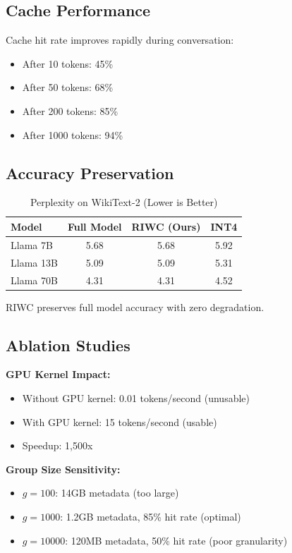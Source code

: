 \documentclass[twocolumn,10pt]{article}
\begin{document}
\subsection{Cache Performance}

Cache hit rate improves rapidly during conversation:

\begin{itemize}
    \item After 10 tokens: 45\%
    \item After 50 tokens: 68\%
    \item After 200 tokens: 85\%
    \item After 1000 tokens: 94\%
\end{itemize}

\subsection{Accuracy Preservation}

\begin{table}[h]
\centering
\caption{Perplexity on WikiText-2 (Lower is Better)}
\begin{tabular}{lccc}
\toprule
\textbf{Model} & \textbf{Full Model} & \textbf{RIWC (Ours)} & \textbf{INT4} \\
\midrule
Llama 7B & 5.68 & 5.68 & 5.92 \\
Llama 13B & 5.09 & 5.09 & 5.31 \\
Llama 70B & 4.31 & 4.31 & 4.52 \\
\bottomrule
\end{tabular}
\label{tab:accuracy}
\end{table}

RIWC preserves full model accuracy with zero degradation.

\subsection{Ablation Studies}

\textbf{GPU Kernel Impact:}
\begin{itemize}
    \item Without GPU kernel: 0.01 tokens/second (unusable)
    \item With GPU kernel: 15 tokens/second (usable)
    \item Speedup: 1,500x
\end{itemize}

\textbf{Group Size Sensitivity:}
\begin{itemize}
    \item $g = 100$: 14GB metadata (too large)
    \item $g = 1000$: 1.2GB metadata, 85\% hit rate (optimal)
    \item $g = 10000$: 120MB metadata, 50\% hit rate (poor granularity)
\end{itemize}
\end{document}
